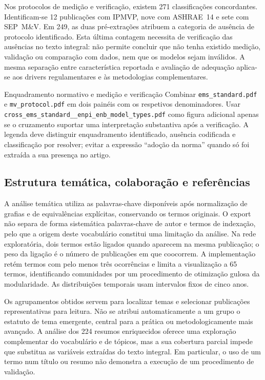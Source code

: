 Nos protocolos de medição e verificação, existem 271 classificações
concordantes. Identificam-se 12 publicações com IPMVP, nove com
ASHRAE~14 e sete com SEP~M\&V. Em 249, as duas pré-extrações
atribuem a categoria de ausência de protocolo identificado.
Esta última contagem necessita de verificação das ausências no
texto integral: não permite concluir que não tenha existido
medição, validação ou comparação com dados, nem que os modelos
sejam inválidos. A mesma separação entre característica reportada
e avaliação de adequação aplica-se aos drivers regulamentares
e às metodologias complementares.

{Enquadramento normativo e medição e verificação}
{Combinar \texttt{ems\_standard.pdf} e \texttt{mv\_protocol.pdf}
em dois painéis com os respetivos denominadores. Usar
\nolinkurl{cross_ems_standard__enpi_enb_model_types.pdf}
como figura adicional apenas se o cruzamento suportar uma
interpretação substantiva após a verificação. A legenda deve
distinguir enquadramento identificado, ausência codificada e
classificação por resolver; evitar a expressão ``adoção da norma''
quando só foi extraída a sua presença no artigo.}%

\subsection{Estrutura temática, colaboração e referências}

A análise temática utiliza as palavras-chave disponíveis após
normalização de grafias e de equivalências explícitas, conservando
os termos originais. O export não separa de forma sistemática
palavras-chave de autor e termos de indexação, pelo que a origem
deste vocabulário constitui uma limitação da análise. Na rede
exploratória, dois termos estão ligados quando aparecem na mesma
publicação; o peso da ligação é o número de publicações em que
coocorrem. A implementação retém termos com pelo menos três
ocorrências e limita a visualização a 65 termos, identificando
comunidades por um procedimento de otimização gulosa da modularidade.
As distribuições temporais usam intervalos fixos de cinco anos.

Os agrupamentos obtidos servem para localizar temas e selecionar
publicações representativas para leitura. Não se atribui
automaticamente a um grupo o estatuto de tema emergente, central
para a prática ou metodologicamente mais avançado. A análise dos
224 resumos enriquecidos oferece uma exploração complementar
do vocabulário e de tópicos, mas a sua cobertura parcial impede
que substitua as variáveis extraídas do texto integral. Em
particular, o uso de um termo num título ou resumo não demonstra
a execução de um procedimento de validação.

